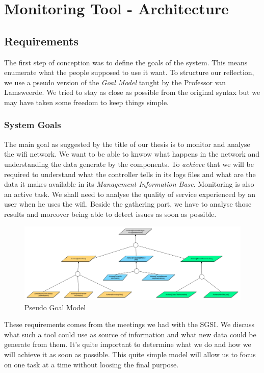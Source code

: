 
\chapter{Monitoring Tool - Architecture} %

\label{Chapter4} %

\section{Requirements}
The first step of conception was to define the goals of the system. This means enumerate what the people supposed to use it want. To structure our reflection, we use a pseudo version of the \emph{Goal Model} taught by the Professor van Lamsweerde\cite{van2009requirements}. We tried to stay as close as possible from the original syntax but we may have taken some freedom to keep things simple.
\subsection{System Goals}
The main goal as suggested by the title of our thesis is to monitor and analyse the wifi network. We want to be able to knwow what happens in the network and understanding the data generate by the components. To \emph{achieve} that we will be required to understand what the controller tells in its logs files and what are the data it makes available in its \emph{Management Information Base}. Monitoring is also an active task. We shall need to analyse the quality of service experienced by an user when he uses the wifi. Beside the gathering part, we have to analyse those results and moreover being able to detect issues as soon as possible.
\begin{figure}[H]
\centering
	\includegraphics[width=1.1\linewidth]{Pictures/chapter4/goals.jpg}
	\caption{Pseudo Goal Model}
\end{figure}
These requirements comes from the meetings we had with the SGSI. We discuss what such a tool could use as source of information and what new data could be generate from them. It's quite important to determine what we do and how we will achieve it as soon as possible. This quite simple model will allow us to focus on one task at a time without loosing the final purpose.

